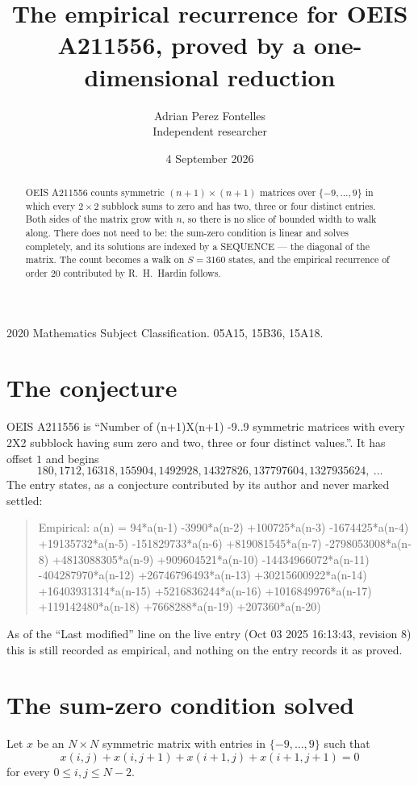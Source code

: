 \documentclass[11pt,a4paper]{article}
\title{The empirical recurrence for OEIS A211556, proved by a one-dimensional reduction}
\author{Adrian Perez Fontelles\\ \small Independent researcher}
\date{4 September 2026}
\theoremstyle{plain}
\theoremstyle{definition}
\begin{document}
\maketitle

\begin{abstract}
OEIS A211556 counts symmetric $(n+1)\times(n+1)$ matrices over
$\{-9,\dots,9\}$ in which every $2\times2$ subblock sums to zero and has two, three or four distinct
entries. Both sides of the matrix grow with $n$, so there is no slice of bounded width to walk
along. There does not need to be: the sum-zero condition is linear and solves completely, and
its solutions are indexed by a SEQUENCE --- the diagonal of the matrix. The count becomes a walk
on $S=3160$ states, and the empirical recurrence of order $20$ contributed by R.~H.~Hardin
follows.
\end{abstract}

\noindent\small 2020 Mathematics Subject Classification. 05A15, 15B36, 15A18.\normalsize

\section{The conjecture}

OEIS A211556 is ``Number of (n+1)X(n+1) -9..9 symmetric matrices with every 2X2 subblock having sum zero and two, three or four distinct values.''. It has offset $1$ and begins
\[
180, 1712, 16318, 155904, 1492928, 14327826, 137797604, 1327935624,\ \dots
\]
The entry states, as a conjecture contributed by its author and never marked settled:
\begin{quote}
Empirical: a(n) = 94*a(n-1) -3990*a(n-2) +100725*a(n-3) -1674425*a(n-4) +19135732*a(n-5) -151829733*a(n-6) +819081545*a(n-7) -2798053008*a(n-8) +4813088305*a(n-9) +909604521*a(n-10) -14434966072*a(n-11) -404287970*a(n-12) +26746796493*a(n-13) +30215600922*a(n-14) +16403931314*a(n-15) +5216836244*a(n-16) +1016849976*a(n-17) +119142480*a(n-18) +7668288*a(n-19) +207360*a(n-20)
\end{quote}
As of the ``Last modified'' line on the live entry (Oct 03 2025 16:13:43, revision 8) this is still
recorded as empirical, and nothing on the entry records it as proved.

\section{The sum-zero condition solved}

Let $x$ be an $N\times N$ symmetric matrix with entries in $\{-9,\dots,9\}$ such that
\[
x(i,j)+x(i,j{+}1)+x(i{+}1,j)+x(i{+}1,j{+}1)=0
\]
for every $0\le i,j\le N-2$.
\end{document}
